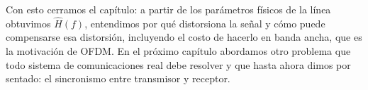 Con esto cerramos el capítulo: a partir de los parámetros físicos de la línea obtuvimos $\hat H(f)$, entendimos por qué distorsiona la señal y cómo puede compensarse esa distorsión, incluyendo el costo de hacerlo en banda ancha, que es la motivación de OFDM. En el próximo capítulo abordamos otro problema que todo sistema de comunicaciones real debe resolver y que hasta ahora dimos por sentado: el sincronismo entre transmisor y receptor.
